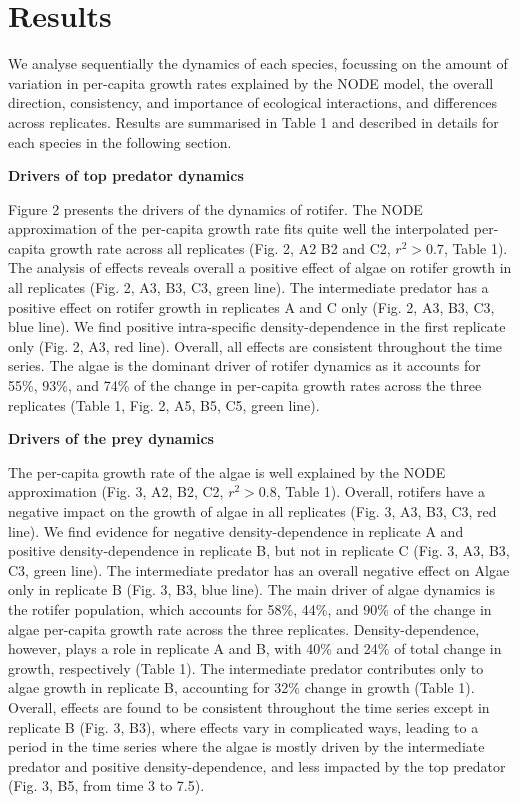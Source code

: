 \documentclass[11pt, oneside]{article}
\begin{document}
\section{Results}

We analyse sequentially the dynamics of each species, focussing on the amount of variation in per-capita growth rates explained by the NODE model, the overall direction, consistency, and importance of ecological interactions, and differences across replicates.
Results are summarised in Table 1 and described in details for each species in the following section.


\textbf{Drivers of top predator dynamics}

Figure 2 presents the drivers of the dynamics of rotifer.
The NODE approximation of the per-capita growth rate fits quite well the interpolated per-capita growth rate across all replicates (Fig. 2, A2 B2 and C2, $r^2 > 0.7$, Table 1).
The analysis of effects reveals overall a positive effect of algae on rotifer growth in all replicates (Fig. 2, A3, B3, C3, green line). 
The intermediate predator has a positive effect on rotifer growth in replicates A and C only (Fig. 2, A3, B3, C3, blue line).
We find positive intra-specific density-dependence in the first replicate only (Fig. 2, A3, red line).
Overall, all effects are consistent throughout the time series.
The algae is the dominant driver of rotifer dynamics as it accounts for 55\%, 93\%, and 74\% of the change in per-capita growth rates across the three replicates (Table 1, Fig. 2, A5, B5, C5, green line).

\textbf{Drivers of the prey dynamics}

The per-capita growth rate of the algae is well explained by the NODE approximation (Fig. 3, A2, B2, C2, $r^2 > 0.8$, Table 1).
Overall, rotifers have a negative impact on the growth of algae in all replicates (Fig. 3, A3, B3, C3, red line).
We find evidence for negative density-dependence in replicate A and positive density-dependence in replicate B, but not in replicate C (Fig. 3, A3, B3, C3, green line).
The intermediate predator has an overall negative effect on Algae only in replicate B (Fig. 3, B3, blue line).
The main driver of algae dynamics is the rotifer population, which accounts for 58\%, 44\%, and 90\% of the change in algae per-capita growth rate across the three replicates.
Density-dependence, however, plays a role in replicate A and B, with 40\% and 24\% of total change in growth, respectively (Table 1).
The intermediate predator contributes only to algae growth in replicate B, accounting for 32\% change in growth (Table 1).
Overall, effects are found to be consistent throughout the time series except in replicate B (Fig. 3, B3), where effects vary in complicated ways, leading to a period in the time series where the algae is mostly driven by the intermediate predator and positive density-dependence, and less impacted by the top predator (Fig. 3, B5, from time 3 to 7.5).
\end{document}
